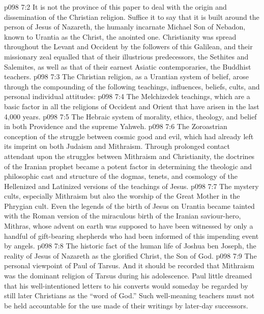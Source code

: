 \vs p098 7:2 It is not the province of this paper to deal with the origin and dissemination of the Christian religion. Suffice it to say that it is built around the person of Jesus of Nazareth, the humanly incarnate Michael Son of Nebadon, known to Urantia as the Christ, the anointed one. Christianity was spread throughout the Levant and Occident by the followers of this Galilean, and their missionary zeal equalled that of their illustrious predecessors, the Sethites and Salemites, as well as that of their earnest Asiatic contemporaries, the Buddhist teachers.
\vs p098 7:3 The Christian religion, as a Urantian system of belief, arose through the compounding of the following teachings, influences, beliefs, cults, and personal individual attitudes:
\vs p098 7:4 \bibnobreakspace The Melchizedek teachings, which are a basic factor in all the religions of Occident and Orient that have arisen in the last 4,000 years.
\vs p098 7:5 \bibnobreakspace The Hebraic system of morality, ethics, theology, and belief in both Providence and the supreme Yahweh.
\vs p098 7:6 \bibnobreakspace The Zoroastrian conception of the struggle between cosmic good and evil, which had already left its imprint on both Judaism and Mithraism. Through prolonged contact attendant upon the struggles between Mithraism and Christianity, the doctrines of the Iranian prophet became a potent factor in determining the theologic and philosophic cast and structure of the dogmas, tenets, and cosmology of the Hellenized and Latinized versions of the teachings of Jesus.
\vs p098 7:7 \bibnobreakspace The mystery cults, especially Mithraism but also the worship of the Great Mother in the Phrygian cult. Even the legends of the birth of Jesus on Urantia became tainted with the Roman version of the miraculous birth of the Iranian saviour\hyp{}hero, Mithras, whose advent on earth was supposed to have been witnessed by only a handful of gift\hyp{}bearing shepherds who had been informed of this impending event by angels.
\vs p098 7:8 \bibnobreakspace The historic fact of the human life of Joshua ben Joseph, the reality of Jesus of Nazareth as the glorified Christ, the Son of God.
\vs p098 7:9 \bibnobreakspace The personal viewpoint of Paul of Tarsus. And it should be recorded that Mithraism was the dominant religion of Tarsus during his adolescence. Paul little dreamed that his well\hyp{}intentioned letters to his converts would someday be regarded by still later Christians as the “word of God.” Such well\hyp{}meaning teachers must not be held accountable for the use made of their writings by later\hyp{}day successors.
